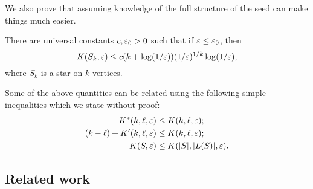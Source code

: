 We also prove that assuming knowledge of the full structure of the
seed can make things much easier.
\begin{thm}
  There are universal constants $c, \varepsilon_0 > 0$ such that if
  $\varepsilon \le \varepsilon_0$, then
  \[
    K(S_k, \varepsilon) \le c (k + \log(1/\varepsilon)) (1/\varepsilon)^{1/k} \log(1/\varepsilon) ,
  \]
  where $S_k$ is a star on $k$ vertices.
\end{thm}

Some of the above quantities can be related using the following simple
inequalities which we state without proof:
\begin{align}
  K^*(k, \ell, \eps) &\le K(k, \ell, \eps) ; \eqlabel{whole-harder-than-heart} \\
  (k - \ell) + K'(k, \ell, \eps) &\le K(k, \ell, \eps) ; \eqlabel{whole-harder-than-leaves} \\
  K(S, \eps) &\le K(|S|, |L(S)|, \eps) . \eqlabel{whole-harder-than-given}
\end{align}

\subsection{Related work}

